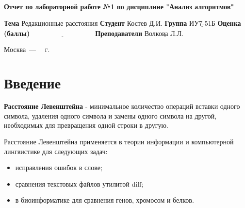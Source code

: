 \documentclass[12pt]{report}
\begin{document}
\begin{titlepage}
	
	\begin{center}
		\noindent\begin{minipage}{1.3\textwidth}\centering
			\Large\textbf{  Отчет по лабораторной работе №1}\newline
			\textbf{по дисциплине "Анализ алгоритмов"}\newline\newline
		\end{minipage}
	\end{center}
	
	\noindent\textbf{Тема} $\underline{\text{Редакционные расстояния}}$\newline\newline
	\noindent\textbf{Студент} $\underline{\text{Костев Д.И.}}$\newline\newline
	\noindent\textbf{Группа} $\underline{\text{ИУ7-51Б}}$\newline\newline
	\noindent\textbf{Оценка (баллы)} $\underline{\text{~~~~~~~~~~~~~~~~~~~~~~~~~~~}}$\newline\newline
	\noindent\textbf{Преподаватели} $\underline{\text{Волкова Л.Л. }}$\newline\newline\newline
	
	\begin{center}
		\vfill
		Москва~---~\the\year
		~г.
	\end{center}
\end{titlepage}

\setcounter{page}{2}
\tableofcontents

\newpage
\chapter*{Введение}
\textbf{Расстояние Левенштейна} - минимальное количество операций вставки одного символа, удаления одного символа и замены одного символа на другой, необходимых для превращения одной строки в другую.
\newline

Расстояние Левенштейна применяется в теории информации и компьютерной лингвистике для следующих задач:
\begin{itemize}
	\item исправления ошибок в слове;
	\item сравнения текстовых файлов утилитой diff;
	\item в биоинформатике для сравнения генов, хромосом и белков.
\end{itemize}
\end{document}
